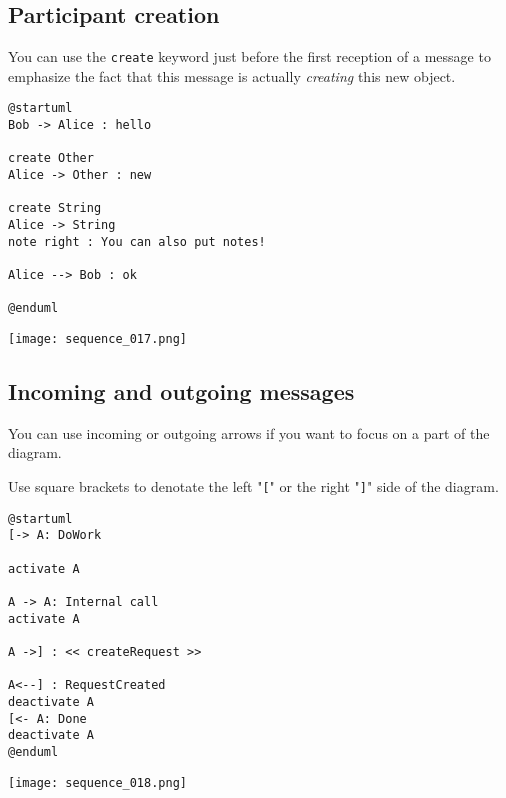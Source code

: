 \newpage \subsection{Participant creation}

You can use the \texttt{create} keyword just before the first reception
of a message to emphasize the fact that this message is actually \textit{creating}
this new object.

\begin{lstlisting}
@startuml
Bob -> Alice : hello

create Other
Alice -> Other : new

create String
Alice -> String
note right : You can also put notes!

Alice --> Bob : ok

@enduml
\end{lstlisting}
\begin{center}
\texttt{[image: sequence\_017.png]}
\end{center}



\newpage \subsection{Incoming and outgoing messages}

\begin{description}
\item You can use incoming or outgoing arrows if you want to focus on a part of the diagram.
\item Use square brackets to denotate the left "\texttt{[}" or the
right "\texttt{]}" side of the diagram.
\end{description}

\begin{lstlisting}
@startuml
[-> A: DoWork

activate A

A -> A: Internal call
activate A

A ->] : << createRequest >>

A<--] : RequestCreated
deactivate A
[<- A: Done
deactivate A
@enduml
\end{lstlisting}
\begin{center}
\texttt{[image: sequence\_018.png]}
\end{center}


